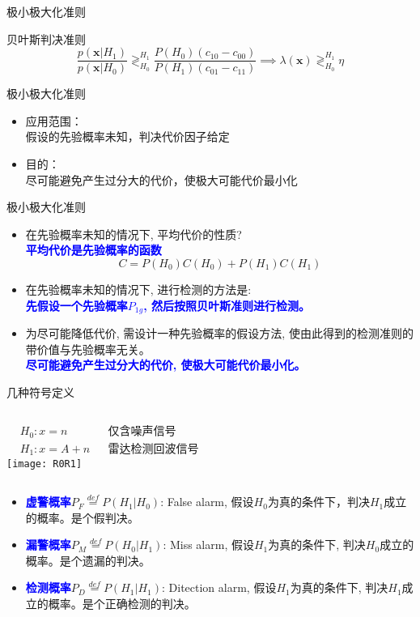 \begin{frame}[shrink]{极小极大化准则}
\begin{block}{贝叶斯判决准则}
	\[ \frac{p(\bm{x}|H_1)}{p(\bm{x}|H_0)}\mathop{\gtrless}_{H_0}^{H_1}\frac{P(H_0)(c_{10}-c_{00})}{P(H_1)(c_{01}-c_{11})} \implies \lambda(\bm{x})\mathop{\gtrless}_{H_0}^{H_1}\eta \]
\end{block}
\begin{block}{极小极大化准则}
	\begin{itemize}
		\setlength{\itemsep}{.5cm}
		\item 应用范围：\\
		假设的先验概率未知，判决代价因子给定
		\item 目的：\\
		尽可能避免产生过分大的代价，使极大可能代价最小化
	\end{itemize}
\end{block}
\end{frame}

\begin{frame}[shrink]{极小极大化准则}
\begin{itemize} 
	\setlength{\itemsep}{.5cm}
	\item 在先验概率未知的情况下, 平均代价的性质?\\
	\textbf{\textcolor{blue}{平均代价是先验概率的函数}}
	\[C=P(H_0)C(H_0)+P(H_1)C(H_1)\]
	\item 在先验概率未知的情况下, 进行检测的方法是:\\
	\textbf{\textcolor{blue}{先假设一个先验概率$P_{1g}$, 然后按照贝叶斯准则进行检测。}}
	\item 为尽可能降低代价, 需设计一种先验概率的假设方法, 使由此得到的检测准则的带价值与先验概率无关。\\
	\textbf{\textcolor{blue}{尽可能避免产生过分大的代价, 使极大可能代价最小化。}}
\end{itemize}
\end{frame}

\begin{frame}{几种符号定义}
\begin{columns}
	\begin{align*}
	&H_0: x=n &&\text{仅含噪声信号}\\
	&H_1: x=A+n &&\text{雷达检测回波信号}
	\end{align*}
	\texttt{[image: R0R1]}
\end{columns}
\begin{itemize}
	\setlength{\itemsep}{.2cm}
	\item \textbf{\textcolor{blue}{虚警概率}}$P_F\mathop{=}\limits^{def}P(H_1|H_0)$: False alarm, 假设$H_0$为真的条件下，判决$H_1$成立的概率。是个假判决。
	\item \textbf{\textcolor{blue}{漏警概率}}$P_M\mathop{=}\limits^{def}P(H_0|H_1)$: Miss alarm, 假设$H_1$为真的条件下, 判决$H_0$成立的概率。是个遗漏的判决。
	\item \textbf{\textcolor{blue}{检测概率}}$P_D\mathop{=}\limits^{def}P(H_1|H_1)$: Ditection alarm, 假设$H_1$为真的条件下, 判决$H_1$成立的概率。是个正确检测的判决。
\end{itemize}
\end{frame}

